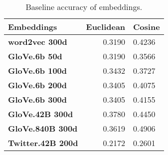 \documentclass[11pt]{article}
\begin{document}
\begin{table}[h]
\begin{center}
\begin{tabular}{|l|rl|}
\hline \bf Embeddings & Euclidean & \bf Cosine \\ \hline
	\bf word2vec 300d & 0.3190 & 0.4236 \\
	\bf GloVe.6b 50d & 0.3190 & 0.3566 \\
	\bf GloVe.6b 100d & 0.3432 & 0.3727 \\
	\bf GloVe.6b 200d & 0.3405 & 0.4075 \\
	\bf GloVe.6b 300d & 0.3405 & 0.4155 \\
	\bf GloVe.42B 300d & 0.3780 & 0.4450 \\
	\bf GloVe.840B 300d & 0.3619 & 0.4906 \\
	\bf Twitter.42B 200d & 0.2172 & 0.2601 \\
\end{tabular}
\end{center}
\caption{\label{font-table} Baseline accuracy of embeddings. }
\end{table}
\end{document}
